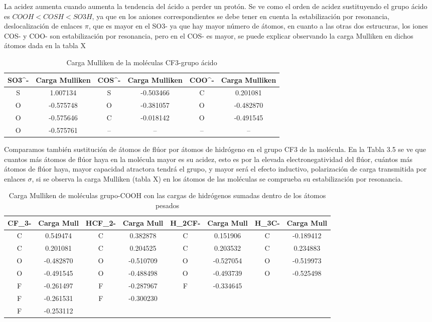 La acidez aumenta cuando aumenta la tendencia del ácido a perder un protón.
Se ve como el orden de acidez sustituyendo el grupo ácido es $ COOH {<} COSH {<} SO3H $, ya que en los aniones correspondientes se debe tener en cuenta la estabilización por resonancia, deslocalización de enlaces $\pi$, que es mayor en el SO3- ya que hay mayor número de átomos, en cuanto a las otras dos estrucuras, los iones COS- y COO- son estabilización por resonancia, pero en el COS- es mayor, se puede explicar observando la carga Mulliken en dichos átomos dada en la tabla X

\begin{table}[H]
    \centering
    \begin{tabular}{|c|c|c|c|c|c|}
    \hline
    SO3^- & Carga Mulliken &COS^- & Carga Mulliken & COO^- & Carga Mulliken \\ \hline
    S & 1.007134 & S & -0.503466 & C & 0.201081 \\ \hline
    O & -0.575748 & O & -0.381057 & O & -0.482870 \\ \hline
    O & -0.575646 & C & -0.018142 & O & -0.491545 \\ \hline
    O & -0.575761 & -- & -- & -- & -- \\ \hline
    \end{tabular}
    \caption{Carga Mulliken de la moléculas CF3-grupo ácido}
    \label{tab:my_label}
\end{table}

Comparamos también sustitución de átomos de flúor por átomos de hidrógeno en el grupo CF3 de la molécula. En la Tabla 3.5 se ve que cuantos más átomos de flúor haya en la molécula mayor es su acidez, esto es por la elevada electronegatividad del flúor, cuántos más átomos de flúor haya, mayor capacidad atractora tendrá el grupo, y mayor será el efecto inductivo, polarización de carga transmitida por enlaces $\sigma$, si se observa la carga Mulliken (tabla X) en los átomos de las moléculas se comprueba su estabilización por resonancia.
\begin{table}[H]
    \centering
    \begin{tabular}{|c|c|c|c|c|c|c|c|}
    \hline
    CF_3- & Carga Mull & HCF_2- & Carga Mull & H_2CF- & Carga Mull & H_3C- & Carga Mull \\ \hline
     C & 0.549474 &  C & 0.382878 & C & 0.151906 & C & -0.189412 \\ \hline
     C & 0.201081 &  C & 0.204525 & C & 0.203532 & C & 0.234883 \\ \hline
     O & -0.482870 & O & -0.510709 & O & -0.527054 & O & -0.519973 \\ \hline
     O & -0.491545 & O & -0.488498 &  O & -0.493739 & O & -0.525498 \\ \hline
     F & -0.261497 & F & -0.287967 & F & -0.334645 &  & \\ \hline
     F & -0.261531 & F & -0.300230 &  &  &  & \\ \hline
     F & -0.253112 &  &  &  &  &  & \\ \hline
    \end{tabular}
    \caption{Carga Mulliken de moléculas grupo-COOH con las cargas de hidrógenos sumadas dentro de los átomos pesados}
    \label{tab:my_label}
\end{table}


